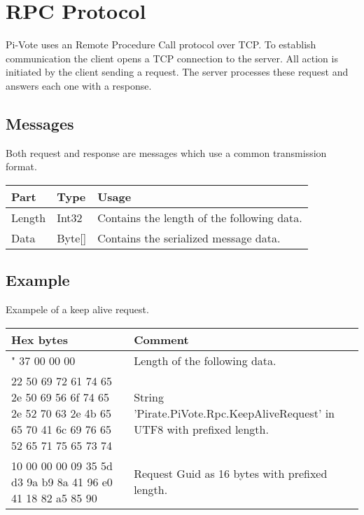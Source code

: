 \section{RPC Protocol}

Pi-Vote uses an Remote Procedure Call protocol over TCP. To establish communication the client opens a TCP connection to the server. All action is initiated by the client sending a request. The server processes these request and answers each one with a response.

\subsection{Messages}

Both request and response are messages which use a common transmission format.

\begin{center}
	\begin{supertabular}{| p{2cm} | p{2cm} | p{8cm}|}
		\hline
		\bf{Part} 	& \bf{Type} 	& \bf{Usage} \\
		\hline
		Length 		& Int32 		& Contains the length of the following data. \\
		\hline
		Data 		& Byte[] 		& Contains the serialized message data. \\
		\hline
	\end{supertabular}
\end{center}

\subsection{Example}

Exampele of a keep alive request.

\begin{center}
	\begin{supertabular}{| p{7cm} | p{8cm} |}
		\hline
		Hex bytes & Comment \\
		\hline"
		37 00 00 00 & Length of the following data. \\
		22 50 69 72 61 74 65 2e  50 69 56 6f 74 65 2e 52 70 63 2e 4b 65 65 70 41 6c 69 76 65 52 65 71 75 65 73 74 & String 'Pirate.PiVote.Rpc.KeepAliveRequest' in UTF8 with prefixed length. \\
		10 00 00 00 09 35 5d d3  9a b9 8a 41 96 e0 41 18 82 a5 85 90 & Request Guid as 16 bytes with prefixed length. \\
		\hline
	\end{supertabular}
\end{center}

